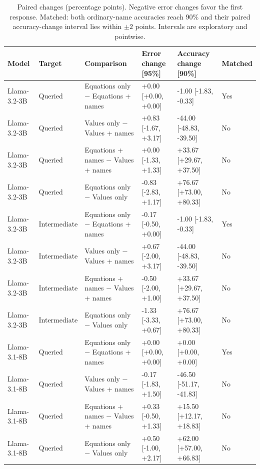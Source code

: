\begin{table}[t]
\centering\small\setlength{\tabcolsep}{3pt}
\begin{tabular}{@{}p{}p{}p{}p{}p{}p{}@{}}
\toprule
Model & Target & Comparison & Error change [95\%] & Accuracy change [90\%] & Matched \\
\midrule
Llama-3.2-3B & Queried & Equations only $-$ Equations + names & +0.00 [+0.00, +0.00] & -1.00 [-1.83, -0.33] & Yes \\
Llama-3.2-3B & Queried & Values only $-$ Values + names & +0.83 [-1.67, +3.17] & -44.00 [-48.83, -39.50] & No \\
Llama-3.2-3B & Queried & Equations + names $-$ Values + names & +0.00 [-1.33, +1.33] & +33.67 [+29.67, +37.50] & No \\
Llama-3.2-3B & Queried & Equations only $-$ Values only & -0.83 [-2.83, +1.17] & +76.67 [+73.00, +80.33] & No \\
Llama-3.2-3B & Intermediate & Equations only $-$ Equations + names & -0.17 [-0.50, +0.00] & -1.00 [-1.83, -0.33] & Yes \\
Llama-3.2-3B & Intermediate & Values only $-$ Values + names & +0.67 [-2.00, +3.17] & -44.00 [-48.83, -39.50] & No \\
Llama-3.2-3B & Intermediate & Equations + names $-$ Values + names & -0.50 [-2.00, +1.00] & +33.67 [+29.67, +37.50] & No \\
Llama-3.2-3B & Intermediate & Equations only $-$ Values only & -1.33 [-3.33, +0.67] & +76.67 [+73.00, +80.33] & No \\
Llama-3.1-8B & Queried & Equations only $-$ Equations + names & +0.00 [+0.00, +0.00] & +0.00 [+0.00, +0.00] & Yes \\
Llama-3.1-8B & Queried & Values only $-$ Values + names & -0.17 [-1.83, +1.50] & -46.50 [-51.17, -41.83] & No \\
Llama-3.1-8B & Queried & Equations + names $-$ Values + names & +0.33 [-0.50, +1.33] & +15.50 [+12.17, +18.83] & No \\
Llama-3.1-8B & Queried & Equations only $-$ Values only & +0.50 [-1.00, +2.17] & +62.00 [+57.00, +66.83] & No \\
\bottomrule
\end{tabular}
\caption{Paired changes (percentage points). Negative error changes favor the first response. Matched: both ordinary-name accuracies reach 90\% and their paired accuracy-change interval lies within $\pm2$ points. Intervals are exploratory and pointwise.}
\label{tab:r7-formats-contrasts-1}
\end{table}

